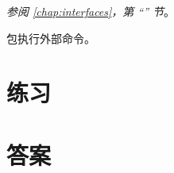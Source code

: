 \begin{description}
{\emph{参阅 \ref{chap:interfaces}，第 ``'' 节}。
}
\item[\package{os/exec}]{
 包执行外部命令。
}
\end{description}

\section{练习}




\cleardoublepage
\section{答案}
\shipoutAnswer
